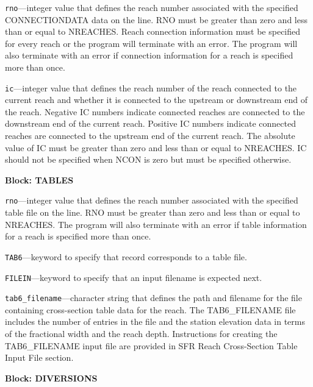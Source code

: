 \begin{description}
\item \texttt{rno}---integer value that defines the reach number associated with the specified CONNECTIONDATA data on the line. RNO must be greater than zero and less than or equal to NREACHES. Reach connection information must be specified for every reach or the program will terminate with an error.  The program will also terminate with an error if connection information for a reach is specified more than once.

\item \texttt{ic}---integer value that defines the reach number of the reach connected to the current reach and whether it is connected to the upstream or downstream end of the reach. Negative IC numbers indicate connected reaches are connected to the downstream end of the current reach. Positive IC numbers indicate connected reaches are connected to the upstream end of the current reach. The absolute value of IC must be greater than zero and less than or equal to NREACHES. IC should not be specified when NCON is zero but must be specified otherwise.

\end{description}
\item \textbf{Block: TABLES}

\begin{description}
\item \texttt{rno}---integer value that defines the reach number associated with the specified table file on the line. RNO must be greater than zero and less than or equal to NREACHES. The program will also terminate with an error if table information for a reach is specified more than once.

\item \texttt{TAB6}---keyword to specify that record corresponds to a table file.

\item \texttt{FILEIN}---keyword to specify that an input filename is expected next.

\item \texttt{tab6\_filename}---character string that defines the path and filename for the file containing cross-section table data for the reach. The TAB6\_FILENAME file includes the number of entries in the file and the station elevation data in terms of the fractional width and the reach depth. Instructions for creating the TAB6\_FILENAME input file are provided in SFR Reach Cross-Section Table Input File section.

\end{description}
\item \textbf{Block: DIVERSIONS}

